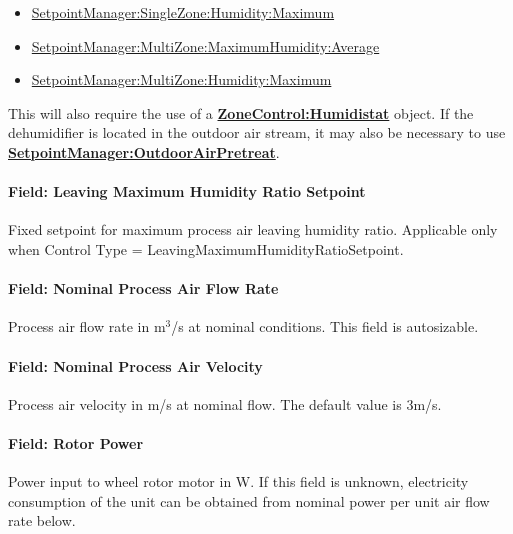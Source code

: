 \begin{itemize}
\item
  \hyperref[setpointmanagersinglezonehumiditymaximum]{SetpointManager:SingleZone:Humidity:Maximum}
\item
  \hyperref[setpointmanagermultizonemaximumhumidityaverage]{SetpointManager:MultiZone:MaximumHumidity:Average}
\item
  \hyperref[setpointmanagermultizonehumiditymaximum]{SetpointManager:MultiZone:Humidity:Maximum}
\end{itemize}

This will also require the use of a \textbf{\hyperref[zonecontrolhumidistat]{ZoneControl:Humidistat}} object. If the dehumidifier is located in the outdoor air stream, it may also be necessary to use \textbf{\hyperref[setpointmanageroutdoorairpretreat]{SetpointManager:OutdoorAirPretreat}}.

\paragraph{Field: Leaving Maximum Humidity Ratio Setpoint}\label{field-leaving-maximum-humidity-ratio-setpoint}

Fixed setpoint for maximum process air leaving humidity ratio. Applicable only when Control Type = LeavingMaximumHumidityRatioSetpoint.

\paragraph{Field: Nominal Process Air Flow Rate}\label{field-nominal-process-air-flow-rate}

Process air flow rate in m\(^{3}\)/s at nominal conditions. This field is autosizable.

\paragraph{Field: Nominal Process Air Velocity}\label{field-nominal-process-air-velocity}

Process air velocity in m/s at nominal flow. The default value is 3m/s.

\paragraph{Field: Rotor Power}\label{field-rotor-power}

Power input to wheel rotor motor in W. If this field is unknown, electricity consumption of the unit can be obtained from nominal power per unit air flow rate below.

